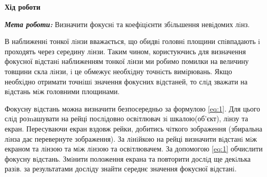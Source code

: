 \begin{center}
    \Large{\textbf{Хід роботи}}    
\end{center}

\vspace{1mm}

\textit{\textbf{Мета роботи:}} Визначити фокуснi та коефiцiєнти збiльшення невiдомих лiнз.
\bigbreak

В наближеннi тонкої лiнзи вважається, що обидвi головнi площини спiвпадають i проходять через
середину лiнзи. Таким чином, користуючись для визначення фокусної вiдстанi наближенням тонкої лiнзи
ми робимо помилки на величину товщини скла лiнзи, i це обмежує необхiдну точнiсть вимiрювань. Якщо
необхiдно отримати точнiшi значення фокусних вiдстаней, то слiд зважати на вiдстань мiж головними
площинами.

Фокусну вiдстань можна визначити безпосередньо за формулою \ref{eq:1}. Для цього слiд розnашувати на
рейці послiдовно освiтлювач зi шкалою(об’єкт), лiнзу та екран. Пересуваючи екран вздовж рейки, добитись
чiткого зображення (збиральна лiнза дає перевернуте зображення). За лiнiйкою на рейці визначити
вiдстанi мiж екраном та лiнзою та мiж лiнзою та освiтлювачем. За допомогою \ref{eq:1} обчислити фокусну
вiдстань. Змiнити положення екрана та повторити дослiд ще декiлька разiв. за результатами дослiду 
знайти середнє значення фокусної вiдстанi.